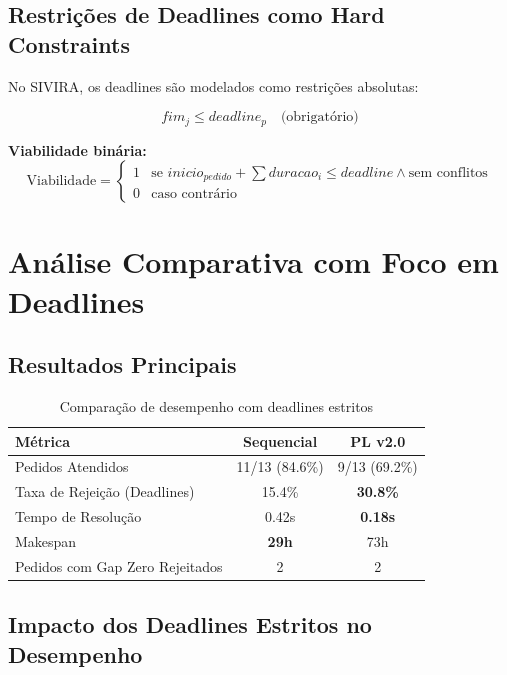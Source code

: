 \documentclass[11pt,a4paper]{article}
\begin{document}
\subsection{Restrições de Deadlines como Hard Constraints}

No SIVIRA, os deadlines são modelados como restrições absolutas:

\begin{equation}
fim_j \leq deadline_p \quad \text{(obrigatório)}
\end{equation}

\textbf{Viabilidade binária:}
\begin{equation}
\text{Viabilidade} = \begin{cases}
1 & \text{se } inicio_{pedido} + \sum duracao_i \leq deadline \land \text{sem conflitos} \\
0 & \text{caso contrário}
\end{cases}
\end{equation}

\section{Análise Comparativa com Foco em Deadlines}

\subsection{Resultados Principais}

\begin{table}[h]
\centering
\begin{tabular}{lcc}
\toprule
\textbf{Métrica} & \textbf{Sequencial} & \textbf{PL v2.0} \\
\midrule
Pedidos Atendidos & 11/13 (84.6\%) & 9/13 (69.2\%) \\
Taxa de Rejeição (Deadlines) & 15.4\% & \textbf{30.8\%} \\
Tempo de Resolução & 0.42s & \textbf{0.18s} \\
Makespan & \textbf{29h} & 73h \\
Pedidos com Gap Zero Rejeitados & 2 & 2 \\
\bottomrule
\end{tabular}
\caption{Comparação de desempenho com deadlines estritos}
\end{table}

\subsection{Impacto dos Deadlines Estritos no Desempenho}
\end{document}

